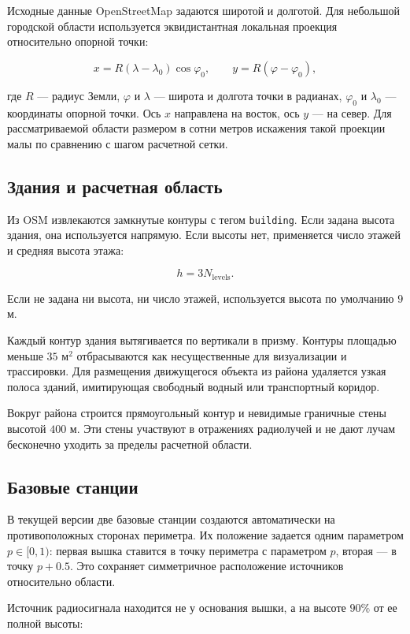 \documentclass[12pt,a4paper]{article}
\begin{document}
Исходные данные OpenStreetMap задаются широтой и долготой. Для небольшой городской области используется эквидистантная локальная проекция относительно опорной точки:

\[
x = R(\lambda - \lambda_0)\cos\varphi_0,
\qquad
y = R(\varphi - \varphi_0),
\]

где $R$ --- радиус Земли, $\varphi$ и $\lambda$ --- широта и долгота точки в радианах, $\varphi_0$ и $\lambda_0$ --- координаты опорной точки. Ось $x$ направлена на восток, ось $y$ --- на север. Для рассматриваемой области размером в сотни метров искажения такой проекции малы по сравнению с шагом расчетной сетки.

\subsection{Здания и расчетная область}

Из OSM извлекаются замкнутые контуры с тегом \texttt{building}. Если задана высота здания, она используется напрямую. Если высоты нет, применяется число этажей и средняя высота этажа:

\[
h = 3N_{\text{levels}}.
\]

Если не задана ни высота, ни число этажей, используется высота по умолчанию $9$ м.

Каждый контур здания вытягивается по вертикали в призму. Контуры площадью меньше $35$ м$^2$ отбрасываются как несущественные для визуализации и трассировки. Для размещения движущегося объекта из района удаляется узкая полоса зданий, имитирующая свободный водный или транспортный коридор.

Вокруг района строится прямоугольный контур и невидимые граничные стены высотой $400$ м. Эти стены участвуют в отражениях радиолучей и не дают лучам бесконечно уходить за пределы расчетной области.

\subsection{Базовые станции}

В текущей версии две базовые станции создаются автоматически на противоположных сторонах периметра. Их положение задается одним параметром $p \in [0, 1)$: первая вышка ставится в точку периметра с параметром $p$, вторая --- в точку $p + 0.5$. Это сохраняет симметричное расположение источников относительно области.

Источник радиосигнала находится не у основания вышки, а на высоте $90\%$ от ее полной высоты:
\end{document}
